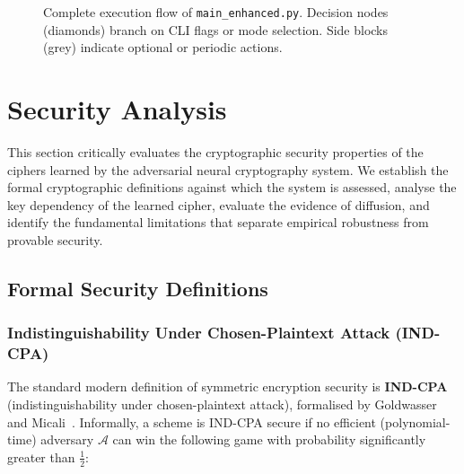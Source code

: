 \documentclass[12pt, a4paper]{article}
\newcommand{\code}[1]{\texttt{\color{CodeRed}#1}}
\begin{document}
\begin{figure}[H]
	\caption{Complete execution flow of \code{main\_enhanced.py}.
		Decision nodes (diamonds) branch on CLI flags or mode selection.
		Side blocks (grey) indicate optional or periodic actions.}
	\label{fig:exec_flow}
\end{figure}

\newpage
\section{Security Analysis}
\label{sec:security}

This section critically evaluates the cryptographic security properties
of the ciphers learned by the adversarial neural cryptography system.
We establish the formal cryptographic definitions against which the
system is assessed, analyse the key dependency of the learned cipher,
evaluate the evidence of diffusion, and identify the fundamental
limitations that separate empirical robustness from provable security.

\subsection{Formal Security Definitions}
\label{subsec:formal_security}

\subsubsection*{Indistinguishability Under Chosen-Plaintext Attack (IND-CPA)}

The standard modern definition of symmetric encryption security is
\textbf{IND-CPA} (indistinguishability under chosen-plaintext attack),
formalised by Goldwasser and Micali~\cite{goldwasser1984probabilistic}.
Informally, a scheme is IND-CPA secure if no efficient (polynomial-time)
adversary $\mathcal{A}$ can win the following game with probability
significantly greater than $\tfrac{1}{2}$:
\end{document}
